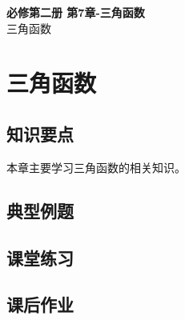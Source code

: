 \documentclass[12pt,a4paper]{article}
\begin{document}
\begin{center}
\LARGE\textbf{必修第二册 第7章-三角函数} \\[0.5em]
\large 三角函数
\end{center}

\tableofcontents
\newpage

\section{三角函数}

\subsection{知识要点}
本章主要学习三角函数的相关知识。

\subsection{典型例题}

\subsection{课堂练习}

\subsection{课后作业}
\end{document}
